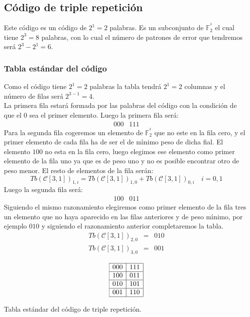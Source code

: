 \subsection{C\'odigo de triple repetici\'on}

Este c\'odigo es un c\'odigo de $2^1=2$ palabras. Es un subconjunto de
$\mathbb{F}^{^3}_2$ el cual tiene $2^3=8$ palabras, con lo cual el n\'umero
de patrones de error que tendremos ser\'a $2^3-2^1=6$.

\subsubsection{Tabla est\'andar del c\'odigo}

Como el c\'odigo tiene $2^1=2$ palabras la tabla tendr\'a $2^1=2$ columnas y
el n\'umero de filas ser\'a $2^{3-1}=4$.\\

La primera fila estar\'a formada por las palabras del c\'odigo con la
condici\'on de que el $0$ sea el primer elemento. Luego la primera fila ser\'a:
\begin{displaymath}
\begin{array}{cc}
000&111
\end{array}
\end{displaymath}
Para la segunda fila cogeremos un elemento de $\mathbb{F}^{^3}_2$ que no este en
la fila cero, y el primer elemento de cada fila ha de ser el de m\'{\i}nimo
peso de dicha fial. El elemento $100$ no esta en la fila cero, luego elegimos
ese elemento como primer elemento de la fila uno ya que es de peso uno y no es
posible encontrar otro de peso menor. El resto de elementos de la fila ser\'an:
\begin{displaymath}
Tb(\mathcal{C}[3,1])_{1,i}=Tb(\mathcal{C}[3,1])_{1,0}+Tb(\mathcal{C}[3,1])_{0,i}
\quad i=0,1
\end{displaymath}
Luego la segunda fila ser\'a:
\begin{displaymath}
\begin{array}{cc}
100&011
\end{array}
\end{displaymath}
Siguiendo el mismo razonamiento elegiremos como primer elemento de la fila tres
un elemento que no haya aparecido en las filas anteriores y de peso m\'{\i}nimo,
por ejemplo $010$ y siguiendo el razonamiento anterior completaremos la tabla.
\begin{eqnarray*}
Tb(\mathcal{C}[3,1])_{2,0}&=&010\\
Tb(\mathcal{C}[3,1])_{3,0}&=&001
\end{eqnarray*}
\begin{table}[!h]
\begin{displaymath}
\begin{array}{|c|c|}
\hline
000&111\\
\hline
100&011\\
\hline
010&101\\
\hline
001&110\\
\hline
\end{array}
\end{displaymath}
\caption{Tabla est\'andar del c\'odigo de triple repetici\'on.}\label{tab:TablaII}
\end{table}

